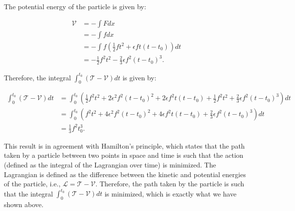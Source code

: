 \documentclass[12pt, a4paper]{article} %
\begin{document}
The potential energy of the particle is given by:

\begin{align*}
\mathcal{V} &= -\int F dx \\
&= -\int f dx \\
&= -\int f \left(\frac{1}{2}ft^2 + \epsilon f t\left(t-t_0\right)\right) dt \\
&= -\frac{1}{2}f^2t^2 - \frac{2}{3}\epsilon f^2\left(t-t_0\right)^3.
\end{align*}

Therefore, the integral $\displaystyle \int_{0}^{t_0} \left(\mathcal{T - V}\right)dt$ is given by:

\begin{align*}
\int_{0}^{t_0} \left(\mathcal{T - V}\right)dt &= \int_{0}^{t_0} \left(\frac{1}{2}f^2t^2 + 2\epsilon^2f^2\left(t-t_0\right)^2 + 2\epsilon f^2t\left(t-t_0\right) + \frac{1}{2}f^2t^2 + \frac{2}{3}\epsilon f^2\left(t-t_0\right)^3\right) dt \\
&= \int_{0}^{t_0} \left(f^2t^2 + 4\epsilon^2f^2\left(t-t_0\right)^2 + 4\epsilon f^2t\left(t-t_0\right) + \frac{2}{3}\epsilon f^2\left(t-t_0\right)^3\right) dt \\
&= \frac{1}{3}f^2t_0^3.
\end{align*}

\BgThispage

This result is in agreement with Hamilton's principle, which states that the path taken by a particle between two points in space and time is such that the action (defined as the integral of the Lagrangian over time) is minimized. The Lagrangian is defined as the difference between the kinetic and potential energies of the particle, i.e., $\mathscr{L} = \mathcal{T} - \mathcal{V}$. Therefore, the path taken by the particle is such that the integral $\displaystyle \int_{0}^{t_0} \left(\mathcal{T - V}\right)dt$ is minimized, which is exactly what we have shown above.
\end{document}
